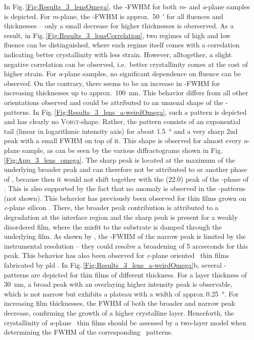 In Fig.\,\ref{Fig:Results_3_lensOmega}, the \textomega-FWHM for both \textit{m}- and \textit{a}-plane samples is depicted.
For \textit{m}-plane, the \textomega-FWHM is approx.\ \qty{50}{\arcminute} for all fluences and thicknesses -- only a small decrease for higher thicknesses is oberserved.
As a result, in Fig.\,\ref{Fig:Results_3_lensCorrelation}, two regimes of high and low fluence can be distinguished, where each regime itself comes with a correlation indicating better crystallinity with less strain.
However, alltogether, a slight negative correlation can be observed, i.e.\ better crystallinity comes at the cost of higher strain.
For \textit{a}-plane samples, no significant dependence on fluence can be observed.
On the contrary, there seems to be an increase in \textomega-FWHM for increasing thicknesses up to approx.\ \qty{100}{\nm}.
This behavior differs from all other orientations observed and could be attributed to an unusual shape of the \textomega-patterns.
In Fig.\,\ref{Fig:Results_3_lens_a-weirdOmega}, such a pattern is depicted and has clearly no \textsc{Voigt}-shape.
Rather, the pattern consists of an exponential tail (linear in logarithmic intensity axis) for about \qty{1.5}{\degree} and a very sharp 2nd peak with a small \gls{FWHM} on top of it.
This shape is observed for almost every \textit{a}-plane sample, as can be seen by the various diffractograms shown in Fig.\,\ref{Fig:App_3_lens_omega}.
The sharp peak is located at the maximum of the underlying broader peak and can therefore not be attributed to  or another phase of \cro, because then it would not shift together with the (22.0) peak of the \textalpha-phase of \cro.
This is also supported by the fact that no anomaly is observed in the \thetaomega-patterns (not shown).
This behavior has previously been observed for  thin films grown on \textit{c}-plane silicon
    \cite{cho2005,durand2011}.
There, the broader peak contribution is attributed to a degradation at the interface region
    \cite{cho2005}
and the sharp peak is present for a weakly disordered film, where the misfit to the substrate is damped through the underlying film.
As shown by \textcite{durand2011}, the \textomega-FWHM of the narrow peak is limited by the instrumental resolution -- they could resolve a broadening of 5 arcseconds for this peak.
This behavior has also been observed for \textit{c}-plane oriented \cro\ thin films fabricated by \acrshort{pld}
    \cite{arca2017}.
In Fig.\,\ref{Fig:Results_3_lens_a-weirdOmega}b, several \textomega-patterns are depicted for thin films of different thickness.
For a layer thickness of \qty{30}{\nm}, a broad peak with an overlaying higher intensity peak is observable, which is not narrow but exhibits a plateau with a width of approx.\,\qty{0.25}{\degree}.
For increasing film thicknesses, the FWHM of both the broader and narrow peak decrease, confirming the growth of a higher crystalline layer.
Henceforth, the crystallinity of \textit{a}-plane \cro\ thin films should be assessed by a two-layer model when determining the FWHM of the corresponding \textomega\ patterns.

